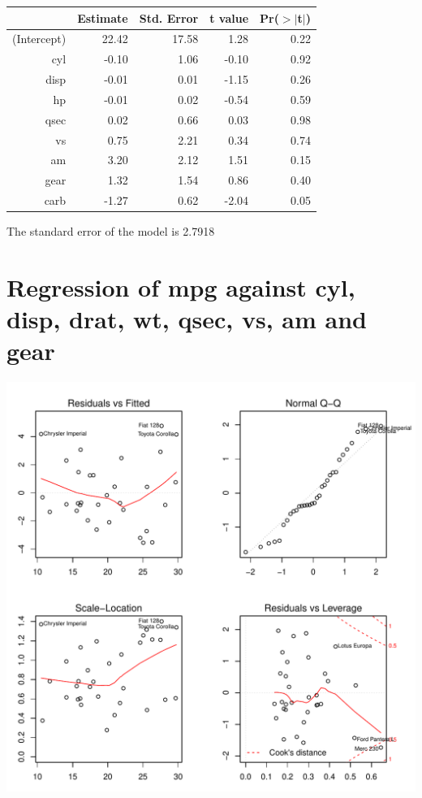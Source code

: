 \documentclass{article}\usepackage[]{graphicx}\usepackage[]{color}
\makeatletter
\def\maxwidth{ %
  \ifdim\Gin@nat@width>\linewidth
    \linewidth
  \else
    \Gin@nat@width
  \fi
}
\newenvironment{knitrout}{}{} %
\makeatother
\begin{document}
\begin{table}[ht]
\centering
\begin{tabular}{rrrrr}
  \hline
 & Estimate & Std. Error & t value & Pr($>$$|$t$|$) \\ 
  \hline
(Intercept) & 22.42 & 17.58 & 1.28 & 0.22 \\ 
  cyl & -0.10 & 1.06 & -0.10 & 0.92 \\ 
  disp & -0.01 & 0.01 & -1.15 & 0.26 \\ 
  hp & -0.01 & 0.02 & -0.54 & 0.59 \\ 
  qsec & 0.02 & 0.66 & 0.03 & 0.98 \\ 
  vs & 0.75 & 2.21 & 0.34 & 0.74 \\ 
  am & 3.20 & 2.12 & 1.51 & 0.15 \\ 
  gear & 1.32 & 1.54 & 0.86 & 0.40 \\ 
  carb & -1.27 & 0.62 & -2.04 & 0.05 \\ 
   \hline
\end{tabular}
\end{table}




The standard error of the model is 2.7918

\newpage

\section{Regression of mpg against cyl, disp, drat, wt, qsec, vs, am and gear }
\begin{knitrout}
\color{fgcolor}

{\centering \includegraphics[width=\maxwidth]{figure/lm-cyl-disp-drat-wt-qsec-vs-am-gear} 

}



\end{knitrout}
\end{document}
